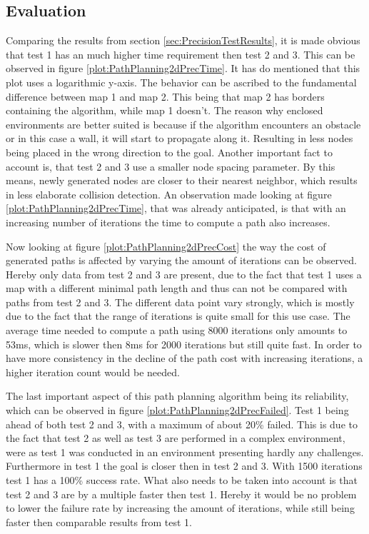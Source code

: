 \subsection{Evaluation}
\label{sec:PrecisionTestEval}
Comparing the results from section \ref{sec:PrecisionTestResults}, it is made obvious that test 1 has an much higher time requirement then test 2 and 3. This can be observed in figure \ref{plot:PathPlanning2dPrecTime}. It has do mentioned that this plot uses a logarithmic y-axis. The behavior can be ascribed to the fundamental difference between map 1 and map 2. This being that map 2 has borders containing the algorithm, while map 1 doesn't. The reason why enclosed environments are better suited is because if the algorithm encounters an obstacle or in this case a wall, it will start to propagate along it. Resulting in less nodes being placed in the wrong direction to the goal. 
Another important fact to account is, that test 2 and 3 use a smaller node spacing parameter. By this means, newly generated nodes are closer to their nearest neighbor, which results in less elaborate collision detection. 
An observation made looking at figure \ref{plot:PathPlanning2dPrecTime}, that was already anticipated, is that with an increasing number of iterations the time to compute a path also increases. 



Now looking at figure \ref{plot:PathPlanning2dPrecCost} the way the cost of generated paths is affected by varying the amount of iterations can be observed. Hereby only data from test 2 and 3 are present, due to the fact that test 1 uses a map with a different minimal path length and thus can not be compared with paths from test 2 and 3. The different data point vary strongly, which is mostly due to the fact that the range of iterations is quite small for this use case. The average time needed to compute a path using 8000 iterations only amounts to 53ms, which is slower then 8ms for 2000 iterations but still quite fast. In order to have more consistency in the decline of the path cost with increasing iterations, a higher iteration count would be needed.



The last important aspect of this path planning algorithm being its reliability, which can be observed in figure \ref{plot:PathPlanning2dPrecFailed}. Test 1 being ahead of both test 2 and 3, with a maximum of about 20\% failed. This is due to the fact that test 2 as well as test 3 are performed in a complex environment, were as test 1 was conducted in an environment presenting hardly any challenges. Furthermore in test 1 the goal is closer then in test 2 and 3. With 1500 iterations test 1 has a 100\% success rate. What also needs to be taken into account is that test 2 and 3 are by a multiple faster then test 1. Hereby it would be no problem to lower the failure rate by increasing the amount of iterations, while still being faster then comparable results from test 1.


